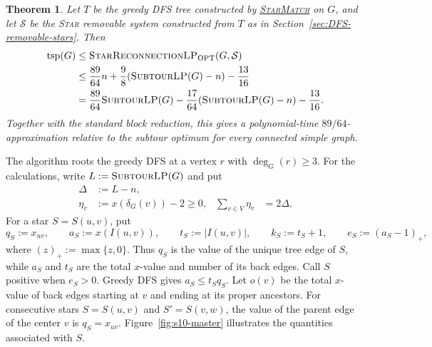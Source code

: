 \documentclass[11pt]{amsart}
\newcommand{\1}{\mathbbm{1}}
\newcommand{\ALG}{\textsc{StarMatch}}
\newcommand{\SubtourLP}{\textsc{SubtourLP}}
\newcommand{\LPtwo}{\textsc{StarReconnectionLP}}
\newtheorem{theorem}{Theorem}[section]
\begin{document}
\begin{theorem}\label{s12pair:theorem}\label{s10g:theorem}
Let $T$ be the greedy DFS tree constructed by
\hyperref[proc:algorithm]{\ALG} on $G$, and let
$\mathcal S$ be the \textsc{Star} removable system constructed
from $T$ as in Section~\ref{sec:DFS-removable-stars}. Then
\begin{equation}\label{s10g:strong-bound}
 \begin{aligned}
 \operatorname{tsp}(G)
 &\le \text{\LPtwo}_{\mathrm{OPT}}(G,\mathcal S)\\
 &\le \frac{89}{64}n+\frac98({\text{\SubtourLP}(G)}-n)-\frac{13}{16}\\
 &=\frac{89}{64}{\text{\SubtourLP}(G)}-\frac{17}{64}({\text{\SubtourLP}(G)}-n)-\frac{13}{16}.
 \end{aligned}
\end{equation}
Together with the standard block reduction, this gives a
polynomial-time $89/64$-approximation relative to the subtour
optimum for every connected simple graph.
\end{theorem}

The algorithm roots the greedy DFS at a vertex $r$ with
$\deg_G(r)\ge3$.
{For the calculations, write $L:=\text{\SubtourLP}(G)$}
and put
\[
 \begin{aligned}
 \Delta&:=L-n,\\
 \eta_v&:=x(\delta_G(v))-2\ge0,
 &\sum_{v\in V}\eta_v&=2\Delta.
 \end{aligned}
\]
{For a star $S=S(u,v)$, put
\[
 q_S:=x_{uv},\qquad a_S:=x(I(u,v)),\qquad
 t_S:=|I(u,v)|,\qquad k_S:=t_S+1,
 \qquad e_S:=(a_S-1)_+,
\]
where $(z)_+:=\max\{z,0\}$. Thus $q_S$ is the value of the
unique tree edge of $S$, while $a_S$ and $t_S$ are the total
$x$-value and number of its back edges. Call $S$ positive when
$e_S>0$. Greedy DFS gives $a_S\le t_Sq_S$.
Let $o(v)$ be the total $x$-value of back edges starting at $v$
and ending at its proper ancestors. For consecutive stars
$S=S(u,v)$ and $S'=S(v,w)$, the value of the parent edge
of the center $v$ is $q_S=x_{uv}$.
{Figure~\ref{fig:s10-master}
illustrates the quantities associated with $S$.}}
\end{document}
